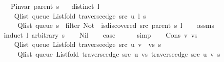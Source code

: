 \begin{isabellebody}
\ \ \ {\isachardoublequoteopen}P{\isacharunderscore}{\kern0pt}invar\ {\isacharparenleft}{\kern0pt}parent\ s{\isacharparenright}{\kern0pt}{\isachardoublequoteclose}\isanewline
\ \ \ {\isachardoublequoteopen}distinct\ l{\isachardoublequoteclose}\isanewline
\ \ \isanewline
\ \ \ \ {\isachardoublequoteopen}Q{\isacharunderscore}{\kern0pt}list\ {\isacharparenleft}{\kern0pt}queue\ {\isacharparenleft}{\kern0pt}List{\isachardot}{\kern0pt}fold\ {\isacharparenleft}{\kern0pt}traverse{\isacharunderscore}{\kern0pt}edge\ src\ u{\isacharparenright}{\kern0pt}\ l\ s{\isacharparenright}{\kern0pt}{\isacharparenright}{\kern0pt}\ {\isacharequal}{\kern0pt}\isanewline
\ \ \ \ \ Q{\isacharunderscore}{\kern0pt}list\ {\isacharparenleft}{\kern0pt}queue\ s{\isacharparenright}{\kern0pt}\ {\isacharat}{\kern0pt}\ filter\ {\isacharparenleft}{\kern0pt}Not\ {\isasymcirc}\ is{\isacharunderscore}{\kern0pt}discovered\ src\ {\isacharparenleft}{\kern0pt}parent\ s{\isacharparenright}{\kern0pt}{\isacharparenright}{\kern0pt}\ l{\isachardoublequoteclose}\isanewline
%
\isadelimproof
\ \ %
\endisadelimproof
%
\isatagproof
{}\isamarkupfalse%
\ assms\isanewline
{}\isamarkupfalse%
\ {\isacharparenleft}{\kern0pt}induct\ l\ arbitrary{\isacharcolon}{\kern0pt}\ s{\isacharparenright}{\kern0pt}\isanewline
\ \ \isamarkupfalse%
\ Nil\isanewline
\ \ \isamarkupfalse%
\ {\isacharquery}{\kern0pt}case\isanewline
\ \ \ \ \isamarkupfalse%
\ simp\isanewline
{}\isamarkupfalse%
\isanewline
\ \ \isamarkupfalse%
\ {\isacharparenleft}{\kern0pt}Cons\ v\ vs{\isacharparenright}{\kern0pt}\isanewline
\ \ \isamarkupfalse%
\isanewline
\ \ \ \ {\isachardoublequoteopen}Q{\isacharunderscore}{\kern0pt}list\ {\isacharparenleft}{\kern0pt}queue\ {\isacharparenleft}{\kern0pt}List{\isachardot}{\kern0pt}fold\ {\isacharparenleft}{\kern0pt}traverse{\isacharunderscore}{\kern0pt}edge\ src\ u{\isacharparenright}{\kern0pt}\ {\isacharparenleft}{\kern0pt}v\ {\isacharhash}{\kern0pt}\ vs{\isacharparenright}{\kern0pt}\ s{\isacharparenright}{\kern0pt}{\isacharparenright}{\kern0pt}\ {\isacharequal}{\kern0pt}\isanewline
\ \ \ \ \ Q{\isacharunderscore}{\kern0pt}list\ {\isacharparenleft}{\kern0pt}queue\ {\isacharparenleft}{\kern0pt}List{\isachardot}{\kern0pt}fold\ {\isacharparenleft}{\kern0pt}traverse{\isacharunderscore}{\kern0pt}edge\ src\ u{\isacharparenright}{\kern0pt}\ vs\ {\isacharparenleft}{\kern0pt}traverse{\isacharunderscore}{\kern0pt}edge\ src\ u\ v\ s{\isacharparenright}{\kern0pt}{\isacharparenright}{\kern0pt}{\isacharparenright}{\kern0pt}{\isachardoublequoteclose}\isanewline

\end{isabellebody}
